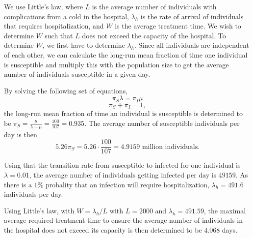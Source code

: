 We use Little's law, where $L$ is the average number of individuals with complications from a cold in the hospital, $\lambda_h$ is the rate of arrival of individuals that requires hospitalization, and $W$ is the average treatment time. We wish to determine $W$ such that $L$ does not exceed the capacity of the hospital.
To determine $W$, we first have to determine $\lambda_h$. Since all individuals are independent of each other, we can calculate the long-run mean fraction of time one individual is susceptible and multiply this with the population size to get the average number of individuals susceptible in a given day.

By solving the following set of equations,
$$ \pi_S \lambda = \pi_I \mu$$
$$ \pi_S + \pi_I = 1 ,$$ 
the long-run mean fraction of time an individual is susceptible is determined to be $\pi_S = \frac{\mu}{\lambda + \mu} = \frac{100}{107} = 0.935.$
The average number of susceptible individuals per day is then 
$$ 5.26  \pi_S = 5.26 \cdot \frac{100}{107} = 4.9159 \text{ million individuals.}$$

Using that the transition rate from susceptible to infected for one individual is $\lambda = 0.01$, the average number of individuals getting infected per day is $49159$. As there is a $1\%$ probality that an infection will require hospitalization, $\lambda_h = 491.6$ individuals per day. 

Using Little's law, with $W = \lambda_h/L$ with $L = 2000$ and $\lambda_h = 491.59$, the maximal average required treatment time to ensure the average number of individuals in the hospital does not exceed its capacity is then determined to be $4.068$ days.
